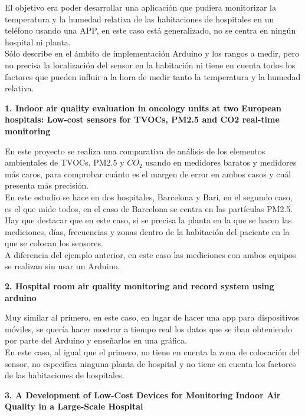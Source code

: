 El objetivo era poder desarrollar una aplicación que pudiera monitorizar la temperatura y la humedad relativa de las habitaciones de hospitales en un teléfono usando una APP, en este caso está generalizado, no se centra en ningún hospital ni planta.\\ Sólo describe en el ámbito de implementación  Arduino y los rangos a medir, pero no precisa la localización del sensor en la habitación ni tiene en cuenta todos los factores que pueden influir a la hora de medir tanto la temperatura y la humedad relativa.

\vskip 0.2in
{{\large \textbf{1. Indoor air quality evaluation in oncology units at two European hospitals: Low-cost sensors for TVOCs, PM2.5 and CO2 real-time monitoring\cite{PALMISANI2021108237}}}} 
\vskip 0.1in

En este proyecto se realiza una comparativa de análisis de los elementos ambientales de TVOCs, PM2.5 y $CO_2$ usando en medidores baratos y medidores más caros, para comprobar cuánto es el margen de error en ambos casos y cuál presenta más precisión. \\En este estudio se hace en dos hospitales, Barcelona y Bari, en el segundo caso, es el que mide todos, en el caso de Barcelona se centra en las partículas PM2.5. \\Hay que destacar que en este caso, si se precisa la planta en la que se hacen las mediciones, días, frecuencias y zonas dentro de la habitación del paciente en la que se colocan los sensores. \\A diferencia del ejemplo anterior, en este caso las mediciones con ambos equipos se realizan sin usar un Arduino.

\vskip 0.2in
{{\large \textbf{2. Hospital room air quality monitoring and record system using arduino\cite{soehospital}}}} 
\vskip 0.1in

Muy similar al primero, en este caso, en lugar de hacer una app para dispositivos móviles, se quería hacer mostrar a tiempo real los datos que se iban obteniendo por parte del Arduino y enseñarlos en una gráfica. \\En este caso, al igual que el primero, no tiene en cuenta la zona de colocación del sensor, no especifica ninguna planta de hospital y no tiene en cuenta los factores de las habitaciones de hospitales.

\newpage

\vskip 0.2in
{{\large \textbf{3. A Development of Low-Cost Devices for Monitoring Indoor Air Quality in a Large-Scale Hospital\cite{8619934}}}} 
\vskip 0.1in

